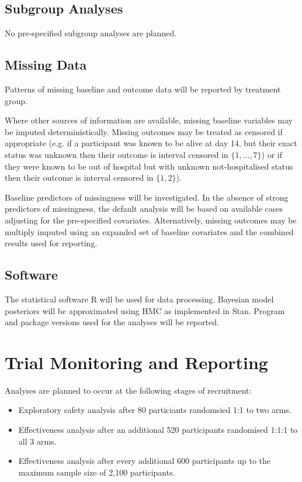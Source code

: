 \documentclass[11pt,parskip=half-]{scrartcl}
\begin{document}
\subsection{Subgroup Analyses}
No pre-specified subgroup analyses are planned.

\subsection{Missing Data}
Patterns of missing baseline and outcome data will be reported by treatment group.

Where other sources of information are available, missing baseline variables may be imputed deterministically. Missing outcomes may be treated as censored if appropriate (e.g. if a participant was known to be alive at day 14, but their exact status was unknown then their outcome is interval censored in $\{1,...,7\}$) or if they were known to be out of hospital but with unknown not-hospitalised status then their outcome is interval censored in $\{1,2\}$).

Baseline predictors of missingness will be investigated. In the absence of strong predictors of missingness, the default analysis will be based on available cases adjusting for the pre-specified covariates. Alternatively, missing outcomes may be multiply imputed using an expanded set of baseline covariates and the combined results used for reporting.

\subsection{Software}
The statistical software R will be used for data processing. Bayesian model posteriors will be approximated using HMC as implemented in Stan. Program and package versions used for the analyses will be reported.

\clearpage

\section{Trial Monitoring and Reporting}

Analyses are planned to occur at the following stages of recruitment:

\begin{itemize}
    \item Exploratory safety analysis after 80 particiants randomsied 1:1 to two arms.
    \item Effectiveness analysis after an additional 520 participants randomised 1:1:1 to all 3 arms.
    \item Effectiveness analysis after every additional 600 participants up to the maximum sample size of 2,100 participants.
\end{itemize}
\end{document}
